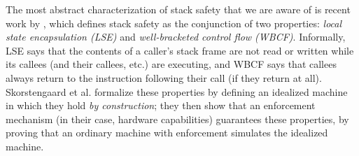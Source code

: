 \documentclass[acmsmall,review,anonymous]{acmart}\settopmatter{printfolios=true,printccs=false,printacmref=false}
\begin{document}
The most abstract characterization of stack safety that we are aware of is
recent work by \citet{SkorstengaardSTKJFP}, which defines stack safety as the conjunction of two
properties:
{\em local state encapsulation (LSE)} and {\em well-bracketed control flow (WBCF)}.
Informally, LSE says that the contents of
a caller's stack frame are not read or written while its callees (and their callees, etc.) are
executing, and WBCF says that callees always
return to the instruction following their call (if they return at all).
Skorstengaard et al.{} formalize these properties by defining an idealized
machine in which they hold {\em by construction};
they then show that an enforcement
mechanism (in their case, hardware capabilities) guarantees these properties, by
proving that an ordinary machine with enforcement simulates the idealized
machine.
\end{document}

